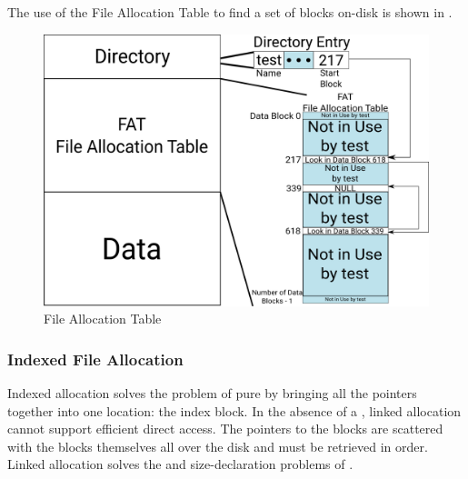 The use of the File Allocation Table to find a set of blocks on-disk is shown in .
\begin{figure}[h!tbp]
  \centering
  \includegraphics[scale=0.9]{./Drawings/EDAF35-Operating_Systems/FAT.png}
  \caption{File Allocation Table}
  \label{fig:File_Allocation_Table}
\end{figure}

\subsubsection{Indexed File Allocation}\label{subsubsec:Indexed_File_Allocation}
Indexed allocation solves the problem of pure  by bringing all the pointers together into one location: the index block.
In the absence of a , linked allocation cannot support efficient direct access.
The pointers to the blocks are scattered with the blocks themselves all over the disk and must be retrieved in order.
Linked allocation solves the  and size-declaration problems of .


